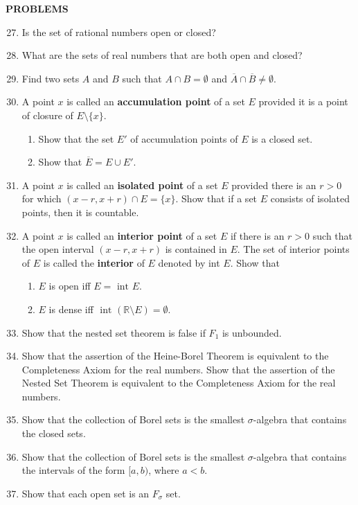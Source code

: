 \documentclass[a4paper,10pt]{book}
\theoremstyle{plain} %
\begin{document}
\begin{center}
	\textbf{PROBLEMS}
\end{center}
\begin{enumerate}
	\setcounter{enumi}{26}
	\item Is the set of rational numbers open or closed?
	\item What are the sets of real numbers that are both open and closed?
	\item Find two sets $A$ and $B$ such that $A \cap B = \emptyset$ and $\overline A \cap \overline B \neq \emptyset.$
	\item A point $x$ is called an \textbf{accumulation point} of a set $E$ provided it is a point of closure of $E \setminus \{ x\}.$
	\begin{enumerate}[label=(\roman*),align=left]
        \item Show that the set $E'$ of accumulation points of $E$ is a closed set.
        \item Show that $\overline E = E \cup E'.$
    \end{enumerate}
	\item A point $x$ is called an \textbf{ isolated point} of a set $E$ provided there is an $r>0$ for which $(x-r,x+r)\cap E = \{x\}.$ Show that if a set $E$ consists of isolated points, then it is countable.
	\item A point $x$ is called an \textbf{interior point} of a set $E$ if there is an $r>0$ such that the open interval $(x-r,x+r)$ is contained in $E$. The set of interior points of $E$ is called the \textbf{interior} of $E$ denoted by int $E$. Show that
	\begin{enumerate}[label=(\roman*),align=left]
        \item $E$ is open iff $E = \text{ int } E$.
        \item $E$ is dense iff $ \text{ int } (\mathbb{R} \setminus E)= \emptyset$.
    \end{enumerate}
	\item Show that the nested set theorem is false if $F_1$ is unbounded.
	\item Show that the assertion of the Heine-Borel Theorem is equivalent to the Completeness Axiom for the real numbers. Show that the assertion of the Nested Set Theorem is equivalent to the Completeness Axiom for the real numbers.
	\item Show that the collection of Borel sets is the smallest $\sigma$-algebra that contains the closed sets.
	\item Show that the collection of Borel sets is the smallest $\sigma$-algebra that contains the intervals of the form $[a,b)$, where $a<b.$
	\item Show that each open set is an $F_{\sigma}$ set.
\end{enumerate}
\end{document}
